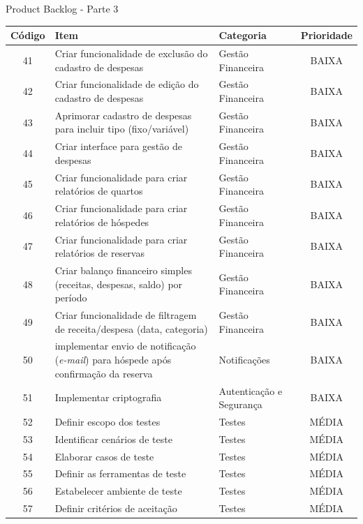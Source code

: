 \documentclass[
	12pt,				%
	openany,			%
	twoside,			%
	a4paper,			%
	english,			%
	french,				%
	spanish,			%
	brazil				%
	]{abntex2}
\begin{document}
 \begin{quadro}[H]
     \caption{Product Backlog - Parte 3}
     	\label{product_backlog_3}
     	\begin{tabular}{|c|p{6.5cm}|p{3.8cm}|c|}
     		\hline
     		\textbf{Código} & \textbf{Item} & \textbf{Categoria} & \textbf{Prioridade} \\	\hline
     		 41 & Criar funcionalidade de exclusão do cadastro de despesas &
     		Gestão Financeira &	BAIXA \\ \hline
     		42 & Criar funcionalidade de edição do cadastro de despesas &
     		Gestão Financeira &	BAIXA \\ \hline
     		43 & Aprimorar cadastro de despesas para incluir tipo (fixo/variável) & Gestão Financeira & BAIXA \\ \hline
     		44 & Criar interface para gestão de despesas & Gestão Financeira & BAIXA \\ \hline
     		45 & Criar funcionalidade para criar relatórios de quartos &
     		Gestão Financeira &	BAIXA \\ \hline
    		46 & Criar funcionalidade para criar relatórios de hóspedes &
    		Gestão Financeira &	BAIXA \\ \hline
     		47 & Criar funcionalidade para criar relatórios de reservas &
     		Gestão Financeira &	BAIXA \\ \hline
     		48 & Criar balanço financeiro simples (receitas, despesas, saldo) por período & Gestão Financeira & BAIXA \\ \hline
     		49 & Criar funcionalidade de filtragem de receita/despesa (data, categoria) &	Gestão Financeira & BAIXA \\ \hline
     		50 & implementar envio de notificação (\textit {e-mail}) para hóspede após confirmação da reserva & Notificações &
     		BAIXA \\ \hline
     		51 & Implementar criptografia &	Autenticação e Segurança &
     		BAIXA \\ \hline
     		52 & Definir escopo dos testes & Testes & MÉDIA \\ \hline
     		53 & Identificar cenários de teste & Testes & MÉDIA \\ \hline
     		54 & Elaborar casos de teste & Testes & MÉDIA \\ \hline
	     	55 & Definir as ferramentas de teste & Testes &	MÉDIA \\ \hline
	     	56 & Estabelecer ambiente de teste & Testes & MÉDIA \\ \hline
	     	57 & Definir critérios de aceitação & Testes & MÉDIA \\ \hline

\end{tabular}
\end{quadro}
\end{document}
